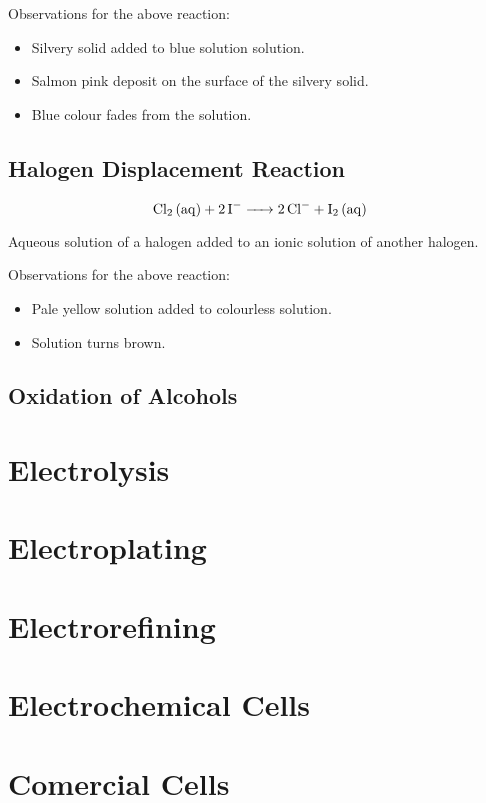 \documentclass[a4paper,11pt]{article}
\begin{document}
Observations for the above reaction:

\begin{itemize}
\item Silvery solid added to blue solution solution.
\item Salmon pink deposit on the surface of the silvery solid.
\item Blue colour fades from the solution.
\end{itemize}

\subsection{Halogen Displacement Reaction}

$$
\ce{Cl2 (aq) + 2I^{-} -> 2Cl^{-} + I2 (aq)}
$$

Aqueous solution of a halogen added to an ionic solution of another halogen.

Observations for the above reaction:

\begin{itemize}
\item Pale yellow solution added to colourless solution.
\item Solution turns brown.
\end{itemize}

\subsection{Oxidation of Alcohols}



\section{Electrolysis}




\section{Electroplating}



\section{Electrorefining}



\section{Electrochemical Cells}



\section{Comercial Cells}
\end{document}
